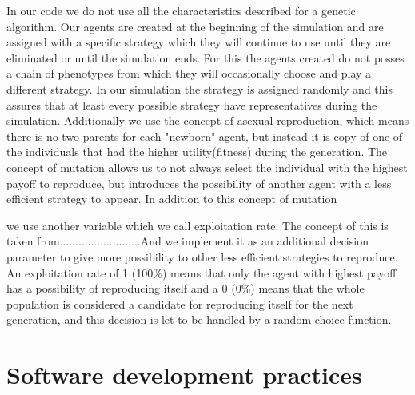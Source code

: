 \documentclass{article}
\begin{document}
In our code we do not use all the characteristics described for a genetic algorithm. Our agents are created at the beginning of the simulation and are assigned with a specific strategy which they will continue to use until they are eliminated or until the simulation ends. For this the agents created do not posses a chain of phenotypes from which they will occasionally choose and play a different strategy. In our simulation the strategy is assigned randomly and this assures that at least every possible strategy have representatives during the simulation. Additionally we use the concept of asexual reproduction, which means there is no two parents for each "newborn" agent, but instead it is copy of one of the individuals that had the higher utility(fitness) during the generation. The concept of mutation allows us to not always select the individual with the highest payoff to reproduce, but introduces the possibility of another agent with a less efficient strategy to appear. In addition to this concept of mutation

we use another variable which we call exploitation rate. The concept of this is taken from..........................And we implement it as   an additional decision parameter to give more possibility to other less efficient strategies to reproduce. An exploitation rate of 1 (100\%) means that only the agent with highest payoff has a possibility of reproducing itself and a 0 (0\%) means that the whole population is considered a candidate for reproducing itself for the next generation, and this decision is let to be handled by a random choice function. 

\section{Software development practices}
\end{document}
